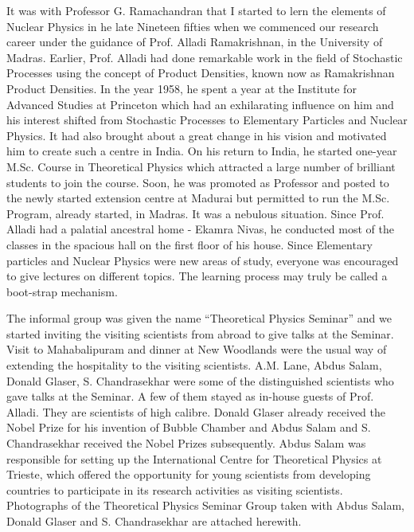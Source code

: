  It was with Professor G. Ramachandran that I started to lern the elements of Nuclear Physics in he late Nineteen fifties when we commenced our research career \cite{key1,key2,key3,key4,key5,key6,key7,key8} under the guidance of Prof. Alladi Ramakrishnan, in the University of Madras. Earlier, Prof. Alladi had done remarkable work in the field of Stochastic Processes using the concept of Product Densities, known now as Ramakrishnan Product Densities. In the year 1958, he spent a year at the Institute for Advanced Studies at Princeton which had an exhilarating influence on him and his interest shifted from Stochastic Processes to Elementary Particles and Nuclear Physics. It had also brought about a great change in his vision and motivated him to create such a centre in India. On his return to India, he started one-year M.Sc. Course in Theoretical Physics which attracted a large number of brilliant students to join the course. Soon, he was promoted as Professor and posted to the newly started extension centre at Madurai but permitted to run the M.Sc. Program, already started, in Madras. It was a nebulous situation. Since Prof. Alladi had a palatial ancestral home - Ekamra Nivas, he conducted most of the classes in the spacious hall on the first floor of his house. Since Elementary particles and Nuclear Physics were new areas of study, everyone was encouraged to give lectures on different topics. The learning process may truly be called a boot-strap mechanism.

The informal group was given the name “Theoretical Physics Seminar” and we started inviting the visiting scientists from abroad to give talks at the Seminar. Visit to Mahabalipuram and dinner at New Woodlands were the usual way of extending the hospitality to the visiting scientists. A.M. Lane, Abdus Salam, Donald Glaser, S. Chandrasekhar were some of the distinguished scientists who gave talks at the Seminar. A few of them stayed as in-house guests of Prof. Alladi. They are scientists of high calibre. Donald Glaser already received the Nobel Prize for his invention of Bubble Chamber and Abdus Salam and S. Chandrasekhar received the Nobel Prizes subsequently. Abdus Salam was responsible for setting up the International Centre for Theoretical Physics at Trieste, which offered the opportunity for young scientists from developing countries to participate in its research activities as visiting scientists. Photographs of the Theoretical Physics Seminar Group taken with Abdus Salam, Donald Glaser and S. Chandrasekhar are attached herewith.
\eject

